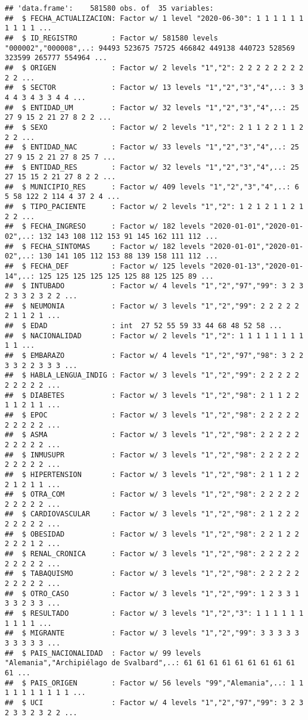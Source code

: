 \documentclass[]{article}
\begin{document}
\begin{verbatim}
## 'data.frame':    581580 obs. of  35 variables:
##  $ FECHA_ACTUALIZACION: Factor w/ 1 level "2020-06-30": 1 1 1 1 1 1 1 1 1 1 ...
##  $ ID_REGISTRO        : Factor w/ 581580 levels "000002","000008",..: 94493 523675 75725 466842 449138 440723 528569 323599 265777 554964 ...
##  $ ORIGEN             : Factor w/ 2 levels "1","2": 2 2 2 2 2 2 2 2 2 2 ...
##  $ SECTOR             : Factor w/ 13 levels "1","2","3","4",..: 3 3 4 4 3 4 3 3 4 4 ...
##  $ ENTIDAD_UM         : Factor w/ 32 levels "1","2","3","4",..: 25 27 9 15 2 21 27 8 2 2 ...
##  $ SEXO               : Factor w/ 2 levels "1","2": 2 1 1 2 2 1 1 2 2 2 ...
##  $ ENTIDAD_NAC        : Factor w/ 33 levels "1","2","3","4",..: 25 27 9 15 2 21 27 8 25 7 ...
##  $ ENTIDAD_RES        : Factor w/ 32 levels "1","2","3","4",..: 25 27 15 15 2 21 27 8 2 2 ...
##  $ MUNICIPIO_RES      : Factor w/ 409 levels "1","2","3","4",..: 6 5 58 122 2 114 4 37 2 4 ...
##  $ TIPO_PACIENTE      : Factor w/ 2 levels "1","2": 1 2 1 2 1 1 2 1 2 2 ...
##  $ FECHA_INGRESO      : Factor w/ 182 levels "2020-01-01","2020-01-02",..: 132 143 108 112 153 91 145 162 111 112 ...
##  $ FECHA_SINTOMAS     : Factor w/ 182 levels "2020-01-01","2020-01-02",..: 130 141 105 112 153 88 139 158 111 112 ...
##  $ FECHA_DEF          : Factor w/ 125 levels "2020-01-13","2020-01-14",..: 125 125 125 125 125 125 88 125 125 89 ...
##  $ INTUBADO           : Factor w/ 4 levels "1","2","97","99": 3 2 3 2 3 3 2 3 2 2 ...
##  $ NEUMONIA           : Factor w/ 3 levels "1","2","99": 2 2 2 2 2 2 1 1 2 1 ...
##  $ EDAD               : int  27 52 55 59 33 44 68 48 52 58 ...
##  $ NACIONALIDAD       : Factor w/ 2 levels "1","2": 1 1 1 1 1 1 1 1 1 1 ...
##  $ EMBARAZO           : Factor w/ 4 levels "1","2","97","98": 3 2 2 3 3 2 2 3 3 3 ...
##  $ HABLA_LENGUA_INDIG : Factor w/ 3 levels "1","2","99": 2 2 2 2 2 2 2 2 2 2 ...
##  $ DIABETES           : Factor w/ 3 levels "1","2","98": 2 1 1 2 2 1 1 2 1 1 ...
##  $ EPOC               : Factor w/ 3 levels "1","2","98": 2 2 2 2 2 2 2 2 2 2 ...
##  $ ASMA               : Factor w/ 3 levels "1","2","98": 2 2 2 2 2 2 2 2 2 2 ...
##  $ INMUSUPR           : Factor w/ 3 levels "1","2","98": 2 2 2 2 2 2 2 2 2 2 ...
##  $ HIPERTENSION       : Factor w/ 3 levels "1","2","98": 2 1 1 2 2 2 1 2 1 1 ...
##  $ OTRA_COM           : Factor w/ 3 levels "1","2","98": 2 2 2 2 2 2 2 2 2 2 ...
##  $ CARDIOVASCULAR     : Factor w/ 3 levels "1","2","98": 2 1 2 2 2 2 2 2 2 2 ...
##  $ OBESIDAD           : Factor w/ 3 levels "1","2","98": 2 2 1 2 2 2 2 2 1 2 ...
##  $ RENAL_CRONICA      : Factor w/ 3 levels "1","2","98": 2 2 2 2 2 2 2 2 2 2 ...
##  $ TABAQUISMO         : Factor w/ 3 levels "1","2","98": 2 2 2 2 2 2 2 2 2 2 ...
##  $ OTRO_CASO          : Factor w/ 3 levels "1","2","99": 1 2 3 3 1 3 3 2 3 3 ...
##  $ RESULTADO          : Factor w/ 3 levels "1","2","3": 1 1 1 1 1 1 1 1 1 1 ...
##  $ MIGRANTE           : Factor w/ 3 levels "1","2","99": 3 3 3 3 3 3 3 3 3 3 ...
##  $ PAIS_NACIONALIDAD  : Factor w/ 99 levels "Alemania","Archipiélago de Svalbard",..: 61 61 61 61 61 61 61 61 61 61 ...
##  $ PAIS_ORIGEN        : Factor w/ 56 levels "99","Alemania",..: 1 1 1 1 1 1 1 1 1 1 ...
##  $ UCI                : Factor w/ 4 levels "1","2","97","99": 3 2 3 2 3 3 2 3 2 2 ...
\end{verbatim}
\end{document}
